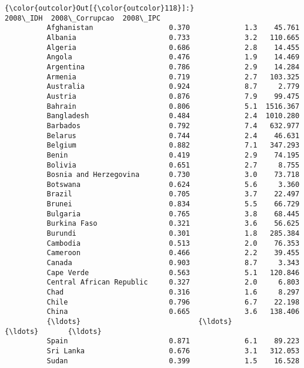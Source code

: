 \documentclass[11pt]{article}
\begin{document}
\begin{Verbatim}[commandchars=\\\{\}]
{\color{outcolor}Out[{\color{outcolor}118}]:}                           2008\_IDH  2008\_Corrupcao  2008\_IPC
          Afghanistan                  0.370             1.3    45.761
          Albania                      0.733             3.2   110.665
          Algeria                      0.686             2.8    14.455
          Angola                       0.476             1.9    14.469
          Argentina                    0.786             2.9    14.284
          Armenia                      0.719             2.7   103.325
          Australia                    0.924             8.7     2.779
          Austria                      0.876             7.9    99.475
          Bahrain                      0.806             5.1  1516.367
          Bangladesh                   0.484             2.4  1010.280
          Barbados                     0.792             7.4   632.977
          Belarus                      0.744             2.4    46.631
          Belgium                      0.882             7.1   347.293
          Benin                        0.419             2.9    74.195
          Bolivia                      0.651             2.7     8.755
          Bosnia and Herzegovina       0.730             3.0    73.718
          Botswana                     0.624             5.6     3.360
          Brazil                       0.705             3.7    22.497
          Brunei                       0.834             5.5    66.729
          Bulgaria                     0.765             3.8    68.445
          Burkina Faso                 0.321             3.6    56.625
          Burundi                      0.301             1.8   285.384
          Cambodia                     0.513             2.0    76.353
          Cameroon                     0.466             2.2    39.455
          Canada                       0.903             8.7     3.343
          Cape Verde                   0.563             5.1   120.846
          Central African Republic     0.327             2.0     6.803
          Chad                         0.316             1.6     8.297
          Chile                        0.796             6.7    22.198
          China                        0.665             3.6   138.406
          {\ldots}                            {\ldots}             {\ldots}       {\ldots}
          Spain                        0.871             6.1    89.223
          Sri Lanka                    0.676             3.1   312.053
          Sudan                        0.399             1.5    16.528

\end{Verbatim}
\end{document}

